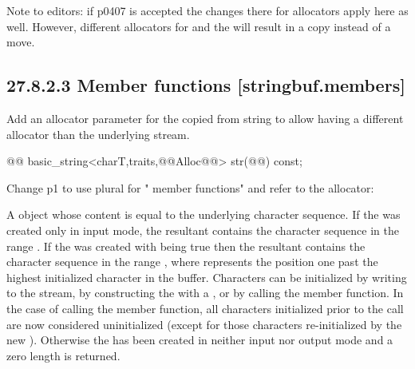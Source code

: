 \documentclass[ebook,11pt,article]{memoir}
\begin{document}
Note to editors: if p0407 is accepted the changes there for allocators apply here as well. However, different allocators for  and the  will result in a copy instead of a move.

\subsection{27.8.2.3 Member functions [stringbuf.members]}
Add an allocator parameter for the copied from string to allow having a different allocator than the underlying stream.
\begin{codeblock}
@@
basic_string<charT,traits,@@Alloc@@> str(@@) const;
\end{codeblock}

Change p1 to use plural for " member functions" and refer to the allocator:

\begin{itemdescr}
\pnum
\returns
A
object whose content is equal to the
underlying character sequence.
If the  was created only in input mode, the resultant
 contains the character sequence in the range
. If the  was created with
 being true then the resultant 
contains the character sequence in the range , where
 represents the position one past the highest initialized character
in the buffer. Characters can be initialized by writing to the stream, by constructing
the  with a , or by calling 
the
 member function. In the case of calling 
the
 member function, all characters initialized prior to
the call are now considered uninitialized (except for those characters re-initialized
by the new ). Otherwise the  has been created
in neither input nor output mode and a zero length  is returned. 
\end{itemdescr}
\end{document}
